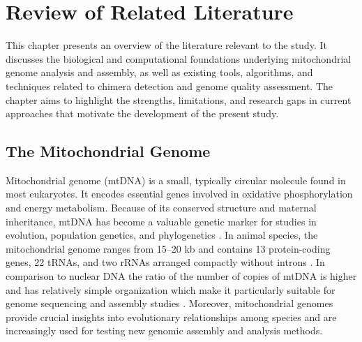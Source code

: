 \chapter{Review of Related Literature}
This chapter presents an overview of the literature relevant to the study. It discusses the biological and computational foundations underlying mitochondrial genome analysis and assembly, as well as existing tools, algorithms, and techniques related to chimera detection and genome quality assessment. The chapter aims to highlight the strengths, limitations, and research gaps in current approaches that motivate the development of the present study.

\section{The Mitochondrial Genome}
Mitochondrial genome (mtDNA) is a small, typically circular molecule found in most eukaryotes. It encodes essential genes involved in oxidative phosphorylation and energy metabolism. Because of its conserved structure and maternal inheritance, mtDNA has become a valuable genetic marker for studies in evolution, population genetics, and phylogenetics \citep{Anderson1981,Boore1999}. 
In animal species, the mitochondrial genome ranges from 15--20 kb and contains 13 protein-coding genes, 22 tRNAs, and two rRNAs arranged compactly without introns \citep{Gray1999}. In comparison to nuclear DNA the ratio of the number of copies of mtDNA is higher and has relatively simple organization which make it particularly suitable for genome sequencing and assembly studies \citep{Dierckxsens2017}. Moreover, mitochondrial genomes provide crucial insights into evolutionary relationships among species and are increasingly used for testing new genomic assembly and analysis methods.


